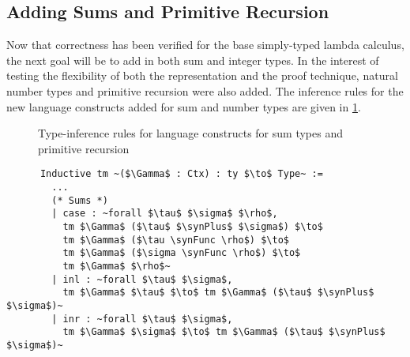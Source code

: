 \subsection{Adding Sums and Primitive Recursion}
  Now that correctness has been verified for the base simply-typed lambda calculus, the next goal will be to add in both sum and integer types.
  In the interest of testing the flexibility of both the representation and the proof technique, natural number types and primitive recursion were also added.
  The inference rules for the new language constructs added for sum and number types are given in \cref{fig:sum_prim_infer}.

  \begin{figure}
    \caption{Type-inference rules for language constructs for sum types and primitive recursion}
    \label{fig:sum_prim_infer}
  \end{figure}

  \begin{listing}
    \begin{verbatim}
      Inductive tm ~($\Gamma$ : Ctx) : ty $\to$ Type~ :=
        ...
        (* Sums *)
        | case : ~forall $\tau$ $\sigma$ $\rho$,
          tm $\Gamma$ ($\tau$ $\synPlus$ $\sigma$) $\to$
          tm $\Gamma$ ($\tau \synFunc \rho$) $\to$
          tm $\Gamma$ ($\sigma \synFunc \rho$) $\to$
          tm $\Gamma$ $\rho$~
        | inl : ~forall $\tau$ $\sigma$,
          tm $\Gamma$ $\tau$ $\to$ tm $\Gamma$ ($\tau$ $\synPlus$ $\sigma$)~
        | inr : ~forall $\tau$ $\sigma$,
          tm $\Gamma$ $\sigma$ $\to$ tm $\Gamma$ ($\tau$ $\synPlus$ $\sigma$)~
    \end{verbatim}
    \caption{Terms in our language related to sum types.}
    \label{lst:stlc_sums}
  \end{listing}

